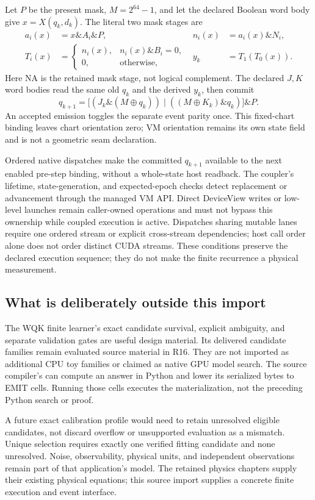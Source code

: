 Let $P$ be the present mask, $M=2^{64}-1$, and let the declared Boolean
word body give $x=X(q_k,d_k)$. The literal two mask stages are
\begin{align}
 a_i(x)&=x\mathbin\&A_i\mathbin\&P,
 &n_i(x)&=a_i(x)\mathbin\&N_i,\nonumber\\
 T_i(x)&=\begin{cases}n_i(x),&n_i(x)\mathbin\&B_i=0,\\
                         0,&\text{otherwise},\end{cases}
 &y_k&=T_1(T_0(x)).
 \label{eq:r16-mask-stages}
\end{align}
Here NA is the retained mask stage, not logical complement. The
declared $J,K$ word bodies read the same old $q_k$ and the derived
$y_k$, then commit
\begin{equation}
 q_{k+1}=\bigl[(J_k\mathbin\&(M\oplus q_k))\mathbin\vert
      ((M\oplus K_k)\mathbin\&q_k)\bigr]\mathbin\&P.
 \label{eq:r16-emit-jk}
\end{equation}
An accepted emission toggles the separate event parity once. This
fixed-chart binding leaves chart orientation zero; VM orientation
remains its own state field and is not a geometric seam declaration.

Ordered native dispatches make the committed $q_{k+1}$ available to
the next enabled pre-step binding, without a whole-state host readback.
The coupler's lifetime, state-generation, and expected-epoch checks
detect replacement or advancement through the managed VM API. Direct
DeviceView writes or low-level launches remain caller-owned operations
and must not bypass this ownership while coupled execution is active.
Dispatches sharing mutable lanes require one ordered stream or explicit
cross-stream dependencies; host call order alone does not order distinct
CUDA streams. These conditions preserve the declared execution sequence;
they do not make the finite recurrence a physical measurement.

\subsection{What is deliberately outside this import}

The WQK finite learner's exact candidate survival, explicit ambiguity,
and separate validation gates are useful design material. Its delivered
candidate families remain evaluated source material in R16. They are
not imported as additional CPU toy families or claimed as native GPU
model search. The source compiler's  can compute
an answer in Python and lower its serialized bytes to EMIT cells.
Running those cells executes the materialization, not the preceding
Python search or proof.

A future exact calibration profile would need to retain unresolved
eligible candidates, not discard overflow or unsupported evaluation as
a mismatch. Unique selection requires exactly one verified fitting
candidate and none unresolved. Noise, observability, physical units,
and independent observations remain part of that application's model.
The retained physics chapters supply their existing physical equations;
this source import supplies a concrete finite execution and event interface.
